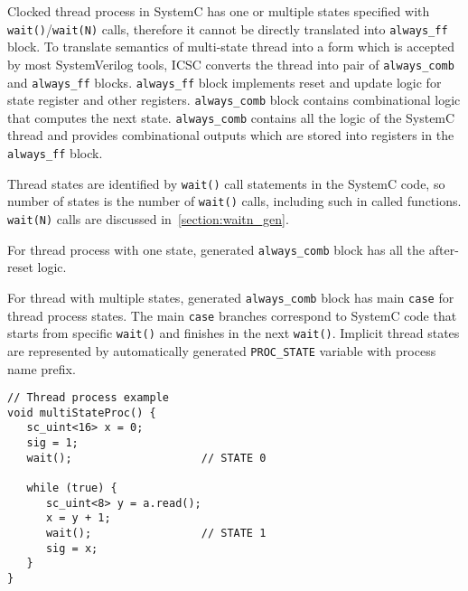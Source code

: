 Clocked thread process in SystemC has one or multiple states specified with {\tt wait()}/{\tt wait(N)} calls, therefore it cannot be directly translated into {\tt always\_ff} block. 
To translate semantics of multi-state thread into a form which is accepted by most SystemVerilog tools, ICSC converts the thread into pair of {\tt always\_comb} and {\tt always\_ff} blocks. {\tt always\_ff} block implements reset and update logic for state register and other registers. {\tt always\_comb} block contains combinational logic that computes the next state. {\tt always\_comb} contains all the logic of the SystemC thread and provides combinational outputs which are stored into registers in the {\tt always\_ff} block. 

Thread states are identified by {\tt wait()} call statements in the SystemC code, so number of states is the number of {\tt wait()} calls, including such in called functions. {\tt wait(N)} calls are discussed in~\ref{section:waitn_gen}. 

For thread process with one state, generated {\tt always\_comb} block has all the after-reset logic.

For thread with multiple states, generated {\tt always\_comb} block has main {\tt case} for thread process states. The main {\tt case} branches correspond to SystemC code that starts from specific {\tt wait()} and finishes in the next {\tt wait()}. Implicit thread states are represented by automatically generated {\tt PROC\_STATE} variable with process name prefix. 

\begin{lstlisting}[style=mycpp]
// Thread process example
void multiStateProc() {
   sc_uint<16> x = 0;
   sig = 1;              
   wait();                    // STATE 0

   while (true) {
      sc_uint<8> y = a.read(); 
      x = y + 1;
      wait();                 // STATE 1
      sig = x;           
   }
}
\end{lstlisting}

